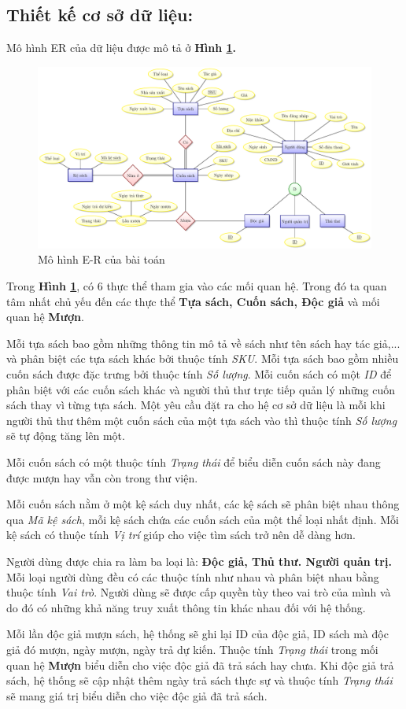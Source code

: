 \documentclass[12pt]{report}
\begin{document}
			\subsection{Thiết kế cơ sở dữ liệu:}
			Mô hình ER của dữ liệu được mô tả ở \textbf{Hình \ref{fig:er}.}\\
			
			\begin{figure}[h]
			\centering
				\includegraphics[scale=0.52]{Database.pdf}
				\caption{Mô hình E-R của bài toán}
				\label{fig:er}
			\end{figure}
			
			Trong \textbf{Hình \ref{fig:er}}, có 6 thực thể tham gia vào các mối quan hệ. Trong đó ta quan tâm nhất chủ yếu đến các thực thể \textbf{Tựa sách, Cuốn sách, Độc giả} và mối quan hệ \textbf{Mượn}.
			\par Mỗi tựa sách bao gồm những thông tin mô tả về sách như tên sách hay tác giả,... và phân biệt các tựa sách khác bởi thuộc tính \textit{SKU}. Mỗi tựa sách bao gồm nhiều cuốn sách được đặc trưng bởi thuộc tính \textit{Số lượng}. Mỗi cuốn sách có một \textit{ID} để phân biệt với các cuốn sách khác và người thủ thư trực tiếp quản lý những cuốn sách thay vì từng tựa sách. Một yêu cầu đặt ra cho hệ cơ sở dữ liệu là mỗi khi người thủ thư thêm một cuốn sách của một tựa sách vào thì thuộc tính \textit{Số lượng} sẽ tự động tăng lên một.
			\par Mỗi cuốn sách có một thuộc tính \textit{Trạng thái} để biểu diễn cuốn sách này đang được mượn hay vẫn còn trong thư viện.
			\par Mỗi cuốn sách nằm ở một kệ sách duy nhất, các kệ sách sẽ phân biệt nhau thông qua \textit{Mã kệ sách}, mỗi kệ sách chứa các cuốn sách của một thể loại nhất định. Mỗi kệ sách có thuộc tính \textit{Vị trí} giúp cho việc tìm sách trở nên dễ dàng hơn.
			\par Người dùng được chia ra làm ba loại là: \textbf{Độc giả, Thủ thư. Người quản trị.} Mỗi loại người dùng đều có các thuộc tính như nhau và phân biệt nhau bằng thuộc tính \textit{Vai trò}. Người dùng sẽ được cấp quyền tùy theo vai trò của mình và do đó có những khả năng truy xuất thông tin khác nhau đối với hệ thống.
			\par Mỗi lần độc giả mượn sách, hệ thống sẽ ghi lại ID của độc giả, ID sách mà độc giả đó mượn, ngày mượn, ngày trả dự kiến. Thuộc tính \textit{Trạng thái} trong mối quan hệ \textbf{Mượn} biểu diễn cho việc độc giả đã trả sách hay chưa. Khi độc giả trả sách, hệ thống sẽ cập nhật thêm ngày trả sách thực sự và thuộc tính \textit{Trạng thái} sẽ mang giá trị biểu diễn cho việc độc giả đã trả sách. 
\end{document}
